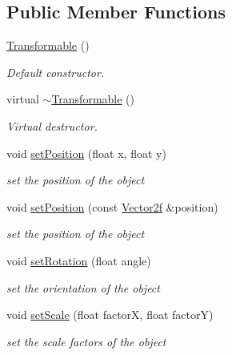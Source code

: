 \subsection*{Public Member Functions}
\begin{DoxyCompactItemize}
\item 
\mbox{\label{classsf_1_1_transformable_ae71710de0fef423121bab1c684954a2e}} 
\hyperlink{classsf_1_1_transformable_ae71710de0fef423121bab1c684954a2e}{Transformable} ()
\begin{DoxyCompactList}\small\item\em Default constructor. \end{DoxyCompactList}\item 
\mbox{\label{classsf_1_1_transformable_a43253abcb863195a673c2a347a7425cc}} 
virtual \hyperlink{classsf_1_1_transformable_a43253abcb863195a673c2a347a7425cc}{$\sim$\+Transformable} ()
\begin{DoxyCompactList}\small\item\em Virtual destructor. \end{DoxyCompactList}\item 
void \hyperlink{classsf_1_1_transformable_a4dbfb1a7c80688b0b4c477d706550208}{set\+Position} (float x, float y)
\begin{DoxyCompactList}\small\item\em set the position of the object \end{DoxyCompactList}\item 
void \hyperlink{classsf_1_1_transformable_af1a42209ce2b5d3f07b00f917bcd8015}{set\+Position} (const \hyperlink{classsf_1_1_vector2}{Vector2f} \&position)
\begin{DoxyCompactList}\small\item\em set the position of the object \end{DoxyCompactList}\item 
void \hyperlink{classsf_1_1_transformable_a32baf2bf1a74699b03bf8c95030a38ed}{set\+Rotation} (float angle)
\begin{DoxyCompactList}\small\item\em set the orientation of the object \end{DoxyCompactList}\item 
void \hyperlink{classsf_1_1_transformable_aaec50b46b3f41b054763304d1e727471}{set\+Scale} (float factorX, float factorY)
\begin{DoxyCompactList}\small\item\em set the scale factors of the object \end{DoxyCompactList}\item 

\end{DoxyCompactItemize}
